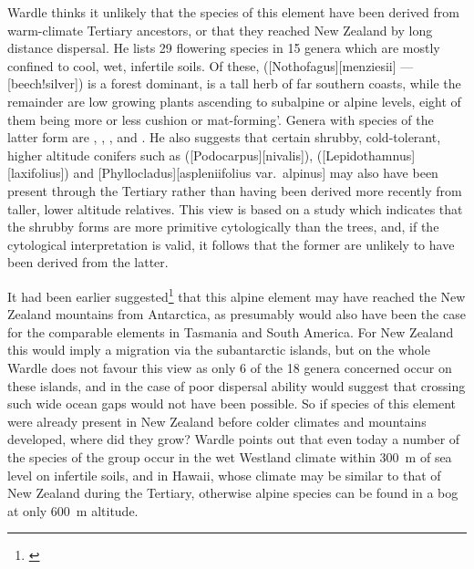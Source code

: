 Wardle thinks it unlikely that the species of this element have been derived from warm-climate Tertiary ancestors, or that they reached New Zealand by long distance dispersal.
He lists 29 flowering species in 15 genera which are mostly confined to cool, wet, infertile soils.
Of these,  ([Nothofagus][menziesii] --- [beech!silver]) is a forest dominant,  is a tall herb of far southern coasts, while the remainder are low growing plants ascending to subalpine or alpine levels, eight of them being more or less cushion or mat-forming'.
Genera with species of the latter form are , , ,  and .
He also suggests that certain shrubby, cold-tolerant, higher altitude conifers such as  ([Podocarpus][nivalis]),  ([Lepidothamnus][laxifolius]) and [Phyllocladus][aspleniifolius var.\ alpinus] may also have been present through the Tertiary rather than having been derived more recently from taller, lower altitude relatives.
This view is based on a study which indicates that the shrubby forms are more primitive cytologically than the trees, and, if the cytological interpretation is valid, it follows that the former are unlikely to have been derived from the latter.

It had been earlier suggested\footnote{\cite{fleming1963age}} that this alpine element may have reached the New Zealand mountains from Antarctica, as presumably would also have been the case for the comparable elements in Tasmania and South America.
For New Zealand this would imply a migration via the subantarctic islands, but on the whole Wardle does not favour this view as only 6 of the 18 genera concerned occur on these islands, and in the case of  poor dispersal ability would suggest that crossing such wide ocean gaps would not have been possible.
So if species of this element were already present in New Zealand before colder climates and mountains developed, where did they grow? Wardle points out that even today a number of the species of the group occur in the wet Westland climate within \SI{300}{\metre} of sea level on infertile soils, and in Hawai{\okina}i, whose climate may be similar to that of New Zealand during the Tertiary, otherwise alpine species can be found in a bog at only \SI{600}{\metre} altitude.


